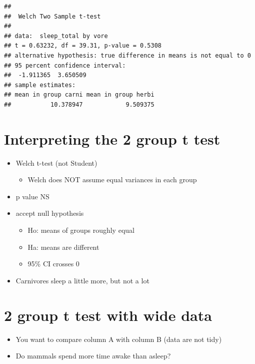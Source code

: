 \documentclass[
]{book}
\providecommand{\tightlist}{%
  \setlength{\itemsep}{0pt}\setlength{\parskip}{0pt}}
\begin{document}
\begin{verbatim}
## 
##  Welch Two Sample t-test
## 
## data:  sleep_total by vore
## t = 0.63232, df = 39.31, p-value = 0.5308
## alternative hypothesis: true difference in means is not equal to 0
## 95 percent confidence interval:
##  -1.911365  3.650509
## sample estimates:
## mean in group carni mean in group herbi 
##           10.378947            9.509375
\end{verbatim}

\hypertarget{interpreting-the-2-group-t-test-1}{%
\section{Interpreting the 2 group t test}\label{interpreting-the-2-group-t-test-1}}

\begin{itemize}
\tightlist
\item
  Welch t-test (not Student)

  \begin{itemize}
  \tightlist
  \item
    Welch does NOT assume equal variances in each group
  \end{itemize}
\item
  p value NS
\item
  accept null hypothesis

  \begin{itemize}
  \tightlist
  \item
    Ho: means of groups roughly equal
  \item
    Ha: means are different
  \item
    95\% CI crosses 0
  \end{itemize}
\item
  Carnivores sleep a little more, but not a lot
\end{itemize}

\hypertarget{group-t-test-with-wide-data-1}{%
\section{2 group t test with wide data}\label{group-t-test-with-wide-data-1}}

\begin{itemize}
\tightlist
\item
  You want to compare column A with column B (data are not tidy)
\item
  Do mammals spend more time awake than asleep?
\end{itemize}
\end{document}
